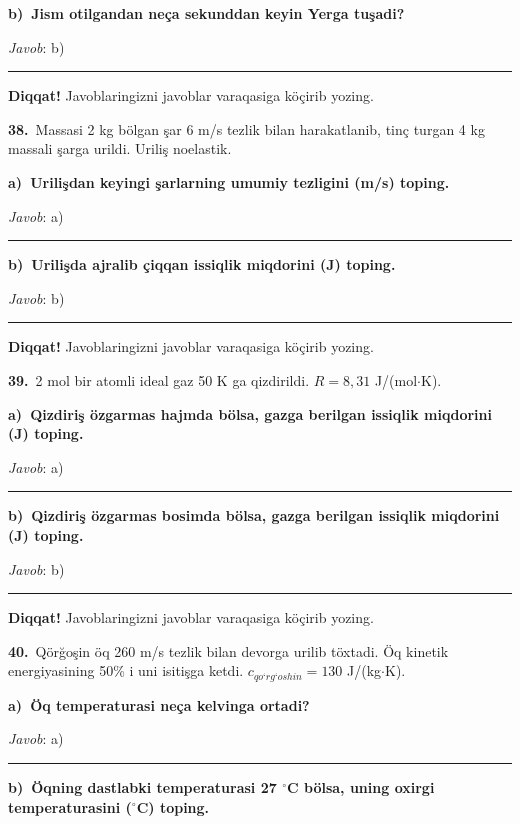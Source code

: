 \documentclass[11pt,a4paper]{article}
\newcommand{\blank}{\rule{5cm}{0.4pt}}
\begin{document}
\medskip\noindent\textbf{b)\ Jism otilgandan neça sekunddan keyin Yerga tuşadi?}\par
\noindent\textit{Javob}: b)\ \blank\par
\medskip\noindent\textbf{Diqqat!} Javoblaringizni javoblar varaqasiga köçirib yozing.\par\vspace{10pt}
\noindent\textbf{38.}\ Massasi 2 kg bölgan şar 6 m/s tezlik bilan harakatlanib, tinç turgan 4 kg massali şarga urildi. Uriliş noelastik.\par\smallskip
\medskip\noindent\textbf{a)\ Urilişdan keyingi şarlarning umumiy tezligini (m/s) toping.}\par
\noindent\textit{Javob}: a)\ \blank\par
\medskip\noindent\textbf{b)\ Urilişda ajralib çiqqan issiqlik miqdorini (J) toping.}\par
\noindent\textit{Javob}: b)\ \blank\par
\medskip\noindent\textbf{Diqqat!} Javoblaringizni javoblar varaqasiga köçirib yozing.\par\vspace{10pt}
\noindent\textbf{39.}\ 2 mol bir atomli ideal gaz 50 K ga qizdirildi. $R=8{,}31$ J/(mol$\cdot$K).\par\smallskip
\medskip\noindent\textbf{a)\ Qizdiriş özgarmas hajmda bölsa, gazga berilgan issiqlik miqdorini (J) toping.}\par
\noindent\textit{Javob}: a)\ \blank\par
\medskip\noindent\textbf{b)\ Qizdiriş özgarmas bosimda bölsa, gazga berilgan issiqlik miqdorini (J) toping.}\par
\noindent\textit{Javob}: b)\ \blank\par
\medskip\noindent\textbf{Diqqat!} Javoblaringizni javoblar varaqasiga köçirib yozing.\par\vspace{10pt}
\noindent\textbf{40.}\ Qörğoşin öq 260 m/s tezlik bilan devorga urilib töxtadi. Öq kinetik energiyasining 50\% i uni isitişga ketdi. $c_{qo‘rg‘oshin}=130$ J/(kg$\cdot$K).\par\smallskip
\medskip\noindent\textbf{a)\ Öq temperaturasi neça kelvinga ortadi?}\par
\noindent\textit{Javob}: a)\ \blank\par
\medskip\noindent\textbf{b)\ Öqning dastlabki temperaturasi 27 $^\circ$C bölsa, uning oxirgi temperaturasini ($^\circ$C) toping.}\par
\end{document}
